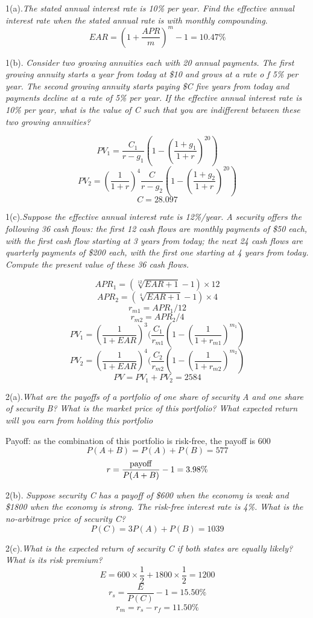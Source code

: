 \documentclass[10pt, a4paper]{article}
\begin{document}
1(a).\emph{The stated annual interest rate is 10\% per year. Find the effective annual interest rate when the stated annual rate is with monthly compounding}.
$$EAR = (1 + \frac{APR}{m})^m - 1 = 10.47\%$$

1(b). \emph{Consider two growing annuities each with 20 annual payments. The first growing annuity starts a year from today at \$10 and grows at a rate o  f 5\% per year. The second growing annuity starts paying \$C five years from today and payments decline at a rate of 5\% per year. If the effective annual interest rate is 10\% per year, what is the value of C such that you are indifferent between these two growing annuities?}

$$PV_1 = \frac{C_1}{r - g_1}(1 - (\frac{1 + g_1}{1 + r})^{20})$$
$$PV_2 = (\frac{1}{1 + r})^4\frac{C}{r - g_2}(1 - (\frac{1 + g_2}{1 + r})^{20})$$
$$C = 28.097$$

1(c).\emph{Suppose the effective annual interest rate is 12\%/year. A security offers the following 36 cash flows: the first 12 cash flows are monthly payments of 
\$50 each, with the first cash flow starting at 3 years from today; the next 24 cash flows are quarterly payments of \$200 each, with the first one starting at 4 years from today. 
Compute the present value of these 36 cash flows.}

$$APR_1 = (\sqrt[12]{EAR + 1} - 1) \times 12 $$
$$APR_2 = (\sqrt[4]{EAR + 1} - 1) \times 4 $$
$$r_{m1} = APR_1 / 12$$
$$r_{m2} = APR_2 / 4$$
$$PV_1 = (\frac{1}{1 + EAR}) ^ 3 (\frac{C_1}{r_{m1}}(1 - (\frac{1}{1 + r_{m1}})^{m_1})$$
$$PV_2 = (\frac{1}{1 + EAR}) ^ 4 (\frac{C_2}{r_{m2}}(1 - (\frac{1}{1 + r_{m2}})^{m_2})$$
$$PV = PV_1 + PV_2 = 2584$$

2(a).\emph{What are the payoffs of a portfolio of one share of security A and one share of security B? What is the market price of this portfolio? What expected return will you earn from holding this portfolio}

Payoff: as the combination of this portfolio is risk-free, the payoff is 600
$$P(A + B) = P(A) + P(B) = 577$$
$$r = \frac{\rm{payoff}}{P(A + B)} - 1 = 3.98\%$$

2(b).\emph{ Suppose security C has a payoff of \$600 when the economy is weak and \$1800 when the economy is strong. The risk-free interest rate is 4\%. What is the no-arbitrage price of security C?}
$$P(C) = 3P(A) + P(B) = 1039$$

2(c).\emph{What is the expected return of security C if both states are equally likely? What is its risk premium?}
$$E = 600 \times \frac{1}{2} + 1800 \times \frac{1}{2} = 1200$$
$$r_s = \frac{E}{P(C)} - 1 = 15.50\%$$
$$r_m = r_s - r_f = 11.50\%$$
\end{document}
